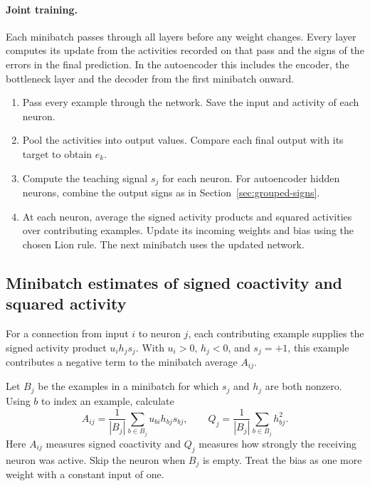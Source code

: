 \documentclass[10pt]{article}
\begin{document}
\paragraph{Joint training.} Each minibatch passes through all layers before any weight changes. Every layer computes its update from the activities recorded on that pass and the signs of the errors in the final prediction. In the autoencoder this includes the encoder, the bottleneck layer and the decoder from the first minibatch onward.
\begin{enumerate}
\item Pass every example through the network. Save the input and activity of each neuron.
\item Pool the activities into output values. Compare each final output with its target to obtain $e_k$.
\item Compute the teaching signal $s_j$ for each neuron. For autoencoder hidden neurons, combine the output signs as in Section~\ref{sec:grouped-signs}.
\item At each neuron, average the signed activity products and squared activities over contributing examples. Update its incoming weights and bias using the chosen Lion rule. The next minibatch uses the updated network.
\end{enumerate}

\subsection{Minibatch estimates of signed coactivity and squared activity}
For a connection from input $i$ to neuron $j$, each contributing example supplies the signed activity product $u_i h_j s_j$. With $u_i>0$, $h_j<0$, and $s_j=+1$, this example contributes a negative term to the minibatch average $A_{ij}$.

Let $B_j$ be the examples in a minibatch for which $s_j$ and $h_j$ are both nonzero. Using $b$ to index an example, calculate
\begin{equation}
 A_{ij}=\frac{1}{|B_j|}\sum_{b\in B_j}u_{bi}h_{bj}s_{bj},
 \qquad
 Q_j=\frac{1}{|B_j|}\sum_{b\in B_j} h_{bj}^2 .
 \label{eq:observations}
\end{equation}
Here $A_{ij}$ measures signed coactivity and $Q_j$ measures how strongly the receiving neuron was active. Skip the neuron when $B_j$ is empty. Treat the bias as one more weight with a constant input of one.
\end{document}
